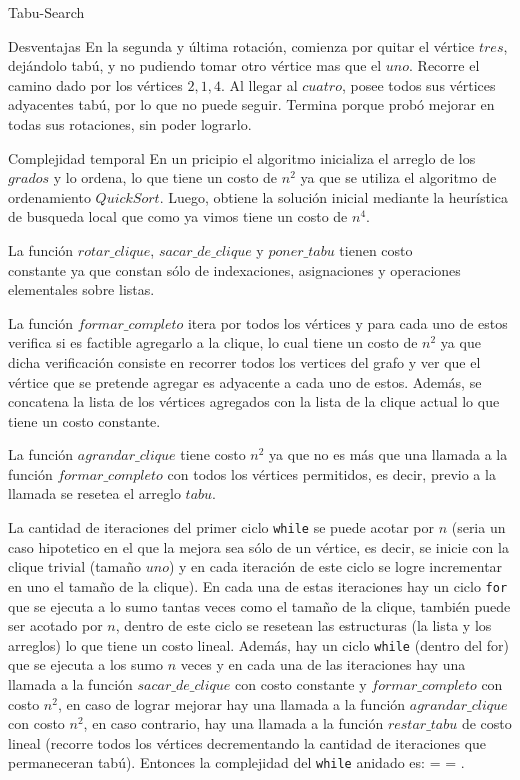 \begin{section}{Tabu-Search}
\begin{subsection}{Desventajas}
		En la segunda y última rotación, comienza por quitar el vértice $tres$, dejándolo tabú, y no pudiendo tomar otro vértice mas que el $uno$. Recorre el camino dado por los vértices $2,1,4$. Al llegar al $cuatro$, posee todos sus vértices adyacentes tabú, por lo que no puede seguir. Termina porque probó mejorar en todas sus rotaciones, sin poder lograrlo.

	\end{subsection}

	\begin{subsection}{Complejidad temporal}
			En un pricipio el algoritmo inicializa el arreglo de los $grados$ y lo ordena, lo que tiene un costo de $n^2$ ya que se utiliza el algoritmo de ordenamiento $QuickSort$. Luego, obtiene la solución inicial mediante la heurística de busqueda local que como ya vimos tiene un costo de $n^4$.

			La función $rotar\_clique$, $sacar\_de\_clique$ y $poner\_tabu$ tienen costo\\ constante ya que constan sólo de indexaciones, asignaciones y operaciones elementales sobre listas.

			La función $formar\_completo$ itera por todos los vértices y para cada uno de estos verifica si es factible agregarlo a la clique, lo cual tiene un costo de $n^2$ ya que dicha verificación consiste en recorrer todos los vertices del grafo y ver que el vértice que se pretende agregar es adyacente a cada uno de estos. Además, se concatena la lista de los vértices agregados con la lista de la clique actual lo que tiene un costo constante.

			La función $agrandar\_clique$ tiene costo $n^2$ ya que no es más que una llamada a la función $formar\_completo$ con todos los vértices permitidos, es decir, previo a la llamada se resetea el arreglo $tabu$.

			 La cantidad de iteraciones del primer ciclo \texttt{while} se puede acotar por $n$ (seria un caso hipotetico en el que la mejora sea sólo de un vértice, es decir, se inicie con la clique trivial (tamaño $uno$) y en cada iteración de este ciclo se logre incrementar en uno el tamaño de la clique). En cada una de estas iteraciones hay un ciclo \texttt{for} que se ejecuta a lo sumo tantas veces como el tamaño de la clique, también puede ser acotado por $n$, dentro de este ciclo se resetean las estructuras (la lista y los arreglos) lo que tiene un costo lineal. Además, hay un ciclo \texttt{while} (dentro del for) que se ejecuta a los sumo $n$ veces y en cada una de las iteraciones hay una llamada a la función $sacar\_de\_clique$ con costo constante y $formar\_completo$ con costo $n^2$, en caso de lograr mejorar hay una llamada a la función $agrandar\_clique$ con costo $n^2$, en caso contrario, hay una llamada a la función $restar\_tabu$ de costo lineal (recorre todos los vértices decrementando la cantidad de iteraciones que permaneceran tabú). Entonces la complejidad del \texttt{while} anidado es:   =  = .


\end{subsection}
\end{section}
